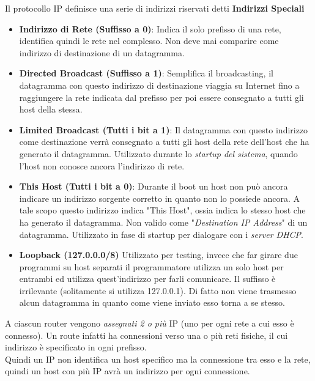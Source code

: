 \documentclass{article}
\newcounter{subsubsubsection}[subsubsection]
\begin{document}
                    Il protocollo IP definisce una serie di indirizzi riservati detti \textbf{Indirizzi Speciali}
                    \begin{itemize}
                        \item \textbf{Indirizzo di Rete (Suffisso a 0)}: Indica il solo prefisso di una rete, identifica quindi le rete nel complesso. Non deve mai comparire come indirizzo di destinazione di un datagramma.
                        \item \textbf{Directed Broadcast (Suffisso a 1)}: Semplifica il broadcasting, il datagramma con questo indirizzo di destinazione viaggia su Internet fino a raggiungere la rete indicata dal prefisso per poi essere consegnato a tutti gli host della stessa.
                        \item \textbf{Limited Broadcast (Tutti i bit a 1)}: Il datagramma con questo indirizzo come destinazione verrà consegnato a tutti gli host della rete dell'host che ha generato il datagramma. Utilizzato durante lo \textit{startup del sistema}, quando l'host non conosce ancora l'indirizzo di rete.
                        \item \textbf{This Host (Tutti i bit a 0)}: Durante il boot un host non può ancora indicare un indirizzo sorgente corretto in quanto non lo possiede ancora. A tale scopo questo indirizzo indica "This Host", ossia indica lo stesso host che ha generato il datagramma. Non valido come "\textit{Destination IP Address}" di un datagramma. Utilizzato in fase di startup per dialogare con i \textit{server DHCP}.
                        \item \textbf{Loopback (127.0.0.0/8)} Utilizzato per testing, invece che far girare due programmi su host separati il programmatore utilizza un solo host per entrambi ed utilizza quest'indirizzo per farli comunicare. Il suffisso è irrilevante (solitamente si utilizza 127.0.0.1). Di fatto non viene trasmesso alcun datagramma in quanto come viene inviato esso torna a se stesso. 
                    \end{itemize}

                    A ciascun router vengono \textit{assegnati 2 o più} IP (uno per ogni rete a cui esso è connesso). Un route infatti ha connessioni verso una o più reti fisiche, il cui indirizzo è specificato in ogni prefisso.\\
                    Quindi un IP non identifica un host specifico ma la connessione tra esso e la rete, quindi un host con più IP avrà un indirizzo per ogni connessione.
\end{document}
